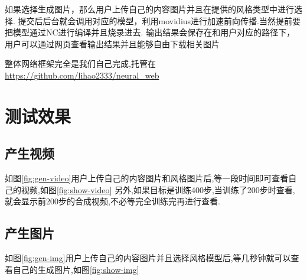 如果选择生成图片，那么用户上传自己的内容图片并且在提供的风格类型中进行选择.
提交后后台就会调用对应的模型，利用movidius进行加速前向传播.当然提前要把模型通过NC进行编译并且烧录进去.
输出结果会保存在和用户对应的路径下，用户可以通过网页查看输出结果并且能够自由下载相关图片

整体网络框架完全是我们自己完成,托管在\url{https://github.com/lihao2333/neural_web}

\section{测试效果}	
\subsection{产生视频}
如图\ref{fig:gen-video}用户上传自己的内容图片和风格图片后,等一段时间即可查看自己的视频,如图\ref{fig:show-video}
另外,如果目标是训练400步,当训练了200步时查看,就会显示前200步的合成视频,不必等完全训练完再进行查看.
\subsection{产生图片}
如图\ref{fig:gen-img}用户上传自己的内容图片并且选择风格模型后,等几秒钟就可以查看自己的生成图片,如图\ref{fig:show-img}
